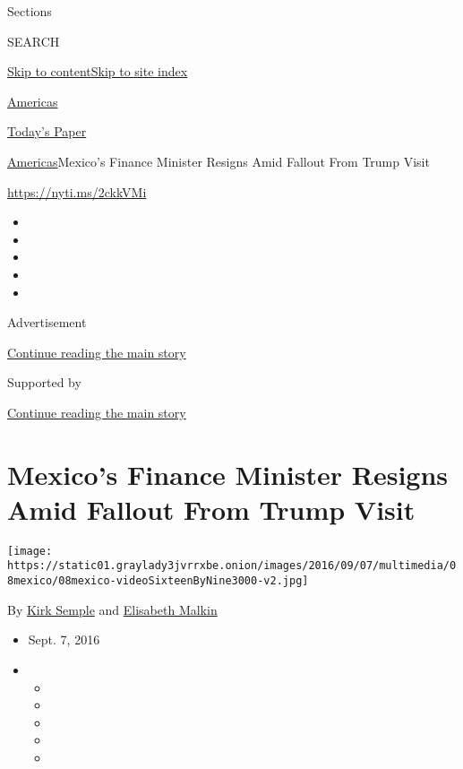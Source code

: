 Sections

SEARCH

\protect\hyperlink{site-content}{Skip to
content}\protect\hyperlink{site-index}{Skip to site index}

\href{https://www.nytimes3xbfgragh.onion/section/world/americas}{Americas}

\href{https://myaccount.nytimes3xbfgragh.onion/auth/login?response_type=cookie\&client_id=vi}{}

\href{https://www.nytimes3xbfgragh.onion/section/todayspaper}{Today's
Paper}

\href{/section/world/americas}{Americas}\textbar{}Mexico's Finance
Minister Resigns Amid Fallout From Trump Visit

\url{https://nyti.ms/2ckkVMi}

\begin{itemize}
\item
\item
\item
\item
\item
\end{itemize}

Advertisement

\protect\hyperlink{after-top}{Continue reading the main story}

Supported by

\protect\hyperlink{after-sponsor}{Continue reading the main story}

\hypertarget{mexicos-finance-minister-resigns-amid-fallout-from-trump-visit}{%
\section{Mexico's Finance Minister Resigns Amid Fallout From Trump
Visit}\label{mexicos-finance-minister-resigns-amid-fallout-from-trump-visit}}

\texttt{[image: https://static01.graylady3jvrrxbe.onion/images/2016/09/07/multimedia/08mexico/08mexico-videoSixteenByNine3000-v2.jpg]}

By \href{http://www.nytimes3xbfgragh.onion/by/kirk-semple}{Kirk Semple}
and
\href{https://www.nytimes3xbfgragh.onion/by/elisabeth-malkin}{Elisabeth
Malkin}

\begin{itemize}
\item
  Sept. 7, 2016
\item
  \begin{itemize}
  \item
  \item
  \item
  \item
  \item
  \end{itemize}
\end{itemize}

